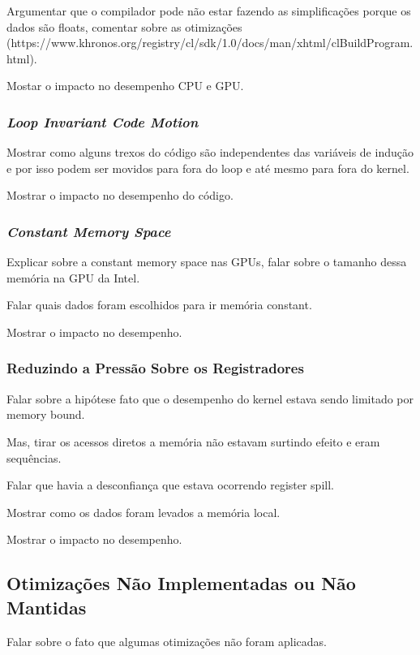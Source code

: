 \documentclass[12pt]{article}
\begin{document}
Argumentar que o compilador pode não estar fazendo as simplificações porque os dados são floats, comentar sobre as otimizações (https://www.khronos.org/registry/cl/sdk/1.0/docs/man/xhtml/clBuildProgram.html).

Mostar o impacto no desempenho CPU e GPU.

\subsubsection{\textit{Loop Invariant Code Motion}}

Mostrar como alguns trexos do código são independentes das variáveis de indução e por isso podem ser movidos para fora do loop e até mesmo para fora do kernel.

Mostrar o impacto no desempenho do código.

\subsubsection{\textit{Constant Memory Space}}

Explicar sobre a constant memory space nas GPUs, falar sobre o tamanho dessa memória na GPU da Intel.

Falar quais dados foram escolhidos para ir memória constant.

Mostrar o impacto no desempenho.

\subsubsection{Reduzindo a Pressão Sobre os Registradores }

Falar sobre a hipótese fato que o desempenho do kernel estava sendo limitado por memory bound.

Mas, tirar os acessos diretos a memória não estavam surtindo efeito e eram sequências.

Falar que havia a desconfiança que estava ocorrendo register spill.

Mostrar como os dados foram levados a memória local.

Mostrar o impacto no desempenho.

\subsection{Otimizações Não Implementadas ou Não Mantidas}

Falar sobre o fato que algumas otimizações não foram aplicadas.
\end{document}
